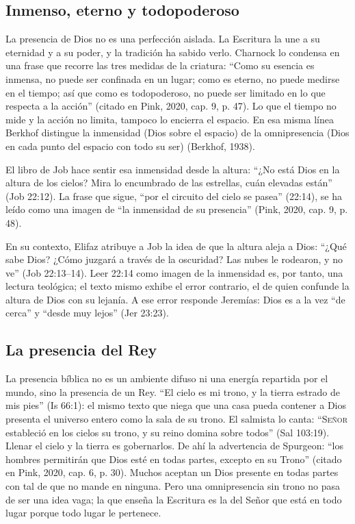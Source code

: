 \documentclass[11pt,letterpaper]{article}
\newcommand{\SENOR}{\textsc{Señor}}
\begin{document}
\subsection{Inmenso, eterno y todopoderoso}

La presencia de Dios no es una perfección aislada. La Escritura la une a su eternidad y a su poder, y la tradición ha sabido verlo. Charnock lo condensa en una frase que recorre las tres medidas de la criatura: ``Como su esencia es inmensa, no puede ser confinada en un lugar; como es eterno, no puede medirse en el tiempo; así que como es todopoderoso, no puede ser limitado en lo que respecta a la acción'' (citado en Pink, 2020, cap. 9, p. 47). Lo que el tiempo no mide y la acción no limita, tampoco lo encierra el espacio. En esa misma línea Berkhof distingue la inmensidad (Dios sobre el espacio) de la omnipresencia (Dios en cada punto del espacio con todo su ser) (Berkhof, 1938).

El libro de Job hace sentir esa inmensidad desde la altura: ``¿No está Dios en la altura de los cielos? Mira lo encumbrado de las estrellas, cuán elevadas están'' (Job 22:12). La frase que sigue, ``por el circuito del cielo se pasea'' (22:14), se ha leído como una imagen de ``la inmensidad de su presencia'' (Pink, 2020, cap. 9, p. 48).

\begin{nota}[Precisión]
En su contexto, Elifaz atribuye a Job la idea de que la altura aleja a Dios: ``¿Qué sabe Dios? ¿Cómo juzgará a través de la oscuridad? Las nubes le rodearon, y no ve'' (Job 22:13--14). Leer 22:14 como imagen de la inmensidad es, por tanto, una lectura teológica; el texto mismo exhibe el error contrario, el de quien confunde la altura de Dios con su lejanía. A ese error responde Jeremías: Dios es a la vez ``de cerca'' y ``desde muy lejos'' (Jer 23:23).
\end{nota}

\subsection{La presencia del Rey}

La presencia bíblica no es un ambiente difuso ni una energía repartida por el mundo, sino la presencia de un Rey. ``El cielo es mi trono, y la tierra estrado de mis pies'' (Is 66:1): el mismo texto que niega que una casa pueda contener a Dios presenta el universo entero como la sala de su trono. El salmista lo canta: ``\SENOR{} estableció en los cielos su trono, y su reino domina sobre todos'' (Sal 103:19). Llenar el cielo y la tierra es gobernarlos. De ahí la advertencia de Spurgeon: ``los hombres permitirán que Dios esté en todas partes, excepto en su Trono'' (citado en Pink, 2020, cap. 6, p. 30). Muchos aceptan un Dios presente en todas partes con tal de que no mande en ninguna. Pero una omnipresencia sin trono no pasa de ser una idea vaga; la que enseña la Escritura es la del Señor que está en todo lugar porque todo lugar le pertenece.
\end{document}
